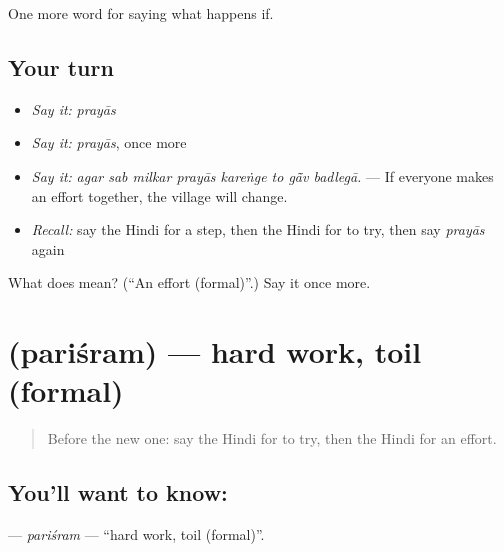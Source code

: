 \begin{grammarlens}[title={What you've built}]
One more word for saying what happens if.
\end{grammarlens}

\subsection*{Your turn}
\begin{itemize}
\raggedright
  \item \emph{Say it:} \emph{prayās}
  \item \emph{Say it:} \emph{prayās}, once more
  \item \emph{Say it:} \emph{agar sab milkar prayās kareṅge to gā̃v badlegā.} — If everyone makes an effort together, the village will change.
  \item \emph{Recall:} say the Hindi for a step, then the Hindi for to try, then say \emph{prayās} again
\end{itemize}

\begin{tcolorbox}[breakable,colback=teal!4,colframe=teal!35!black,title={Before you move on}]
What does  mean? (\textquotedblleft{}An effort (formal)\textquotedblright{}.) Say it once more.
\end{tcolorbox}
\section[\texorpdfstring{\hi{परिश्रम} (pariśram)}{परिश्रम (pariśram)}]{ (pariśram) — hard work, toil (formal)}

\label{lesson:HI-C391-parisram}



\begin{quote}
Before the new one: say the Hindi for to try, then the Hindi for an effort.
\end{quote}

\subsection*{You'll want to know: }
\textbf{} — \emph{pariśram} — \textquotedblleft{}hard work, toil (formal)\textquotedblright{}.

\begin{quote}
        
\end{quote}

